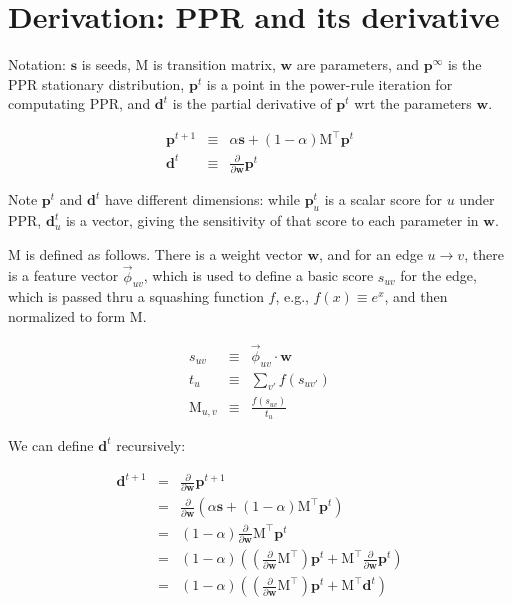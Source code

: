 \documentclass[12pt]{article}
\newcommand{\edge}[2]{{u\rightarrow{}v}}
\newcommand{\edgeuv}{{\edge{u}{v}}}
\newcommand{\vek}[1]{\textbf{#1}}
\newcommand{\ddw}{\frac{\partial}{\partial\vek{w}}}
\newcommand{\M}{\textrm{M}}
\newcommand{\vphi}{\vec{\phi}}
\begin{document}
\section{Derivation: PPR and its derivative}

Notation: $\vek{s}$ is seeds, $\M$ is transition matrix, $\vek{w}$ are
parameters, and $\vek{p}^\infty$ is the PPR stationary distribution,
$\vek{p}^t$ is a point in the power-rule iteration for computating
PPR, and $\vek{d}^t$ is the partial derivative of $\vek{p}^t$ wrt the
parameters $\vek{w}$.

\begin{eqnarray}
\vek{p}^{t+1} & \equiv & \alpha \vek{s} + (1-\alpha) \M^\top \vek{p}^t \\
\vek{d}^t & \equiv &  \ddw \vek{p}^t
\end{eqnarray}

Note $\vek{p}^t$ and $\vek{d}^t$ have different dimensions: while
$\vek{p}^t_u$ is a scalar score for $u$ under PPR, $\vek{d}^t_u$ is a
vector, giving the sensitivity of that score to each parameter in
$\vek{w}$.

$\M$ is defined as follows.  There is a weight vector $\vek{w}$, and
for an edge $\edgeuv$, there is a feature vector $\vphi_{uv}$, which is
used to define a basic score $s_{uv}$ for the edge, which is passed
thru a squashing function $f$, e.g., $f(x)\equiv e^x$, and then
normalized to form $\M$.

\begin{eqnarray}
 s_{uv}   & \equiv & \vphi_{uv} \cdot \vek{w}  \\
 t_u      & \equiv & \sum_{v'} f(s_{uv'}) \\
 \M_{u,v} & \equiv & \frac{ f(s_{uv}) }{ t_u }
\end{eqnarray}

We can define $\vek{d}^t$ recursively:


\begin{eqnarray}
\vek{d}^{t+1}  & =  &  \ddw \vek{p}^{t+1} \\
               & =  &  \ddw \left( \alpha \vek{s} + (1-\alpha) \M^\top \vek{p}^t \right) \\
               & =  &  (1-\alpha) \ddw \M^\top \vek{p}^t \\
               & =  &  (1-\alpha) \left( (\ddw \M^\top) \vek{p}^t  + \M^\top \ddw\vek{p}^t \right) \\
               & =  &  (1-\alpha) \left( (\ddw \M^\top) \vek{p}^t  + \M^\top \vek{d}^t \right)
\end{eqnarray}
\end{document}
